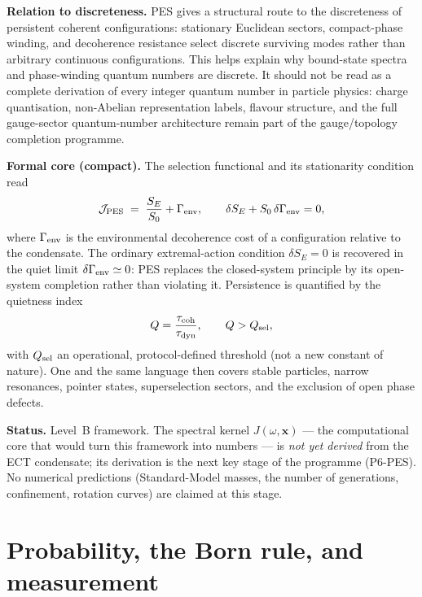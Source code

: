 \documentclass[11pt,a4paper]{article}
\begin{document}
\textbf{Relation to discreteness.} PES gives a structural route to the discreteness of persistent coherent configurations: stationary Euclidean sectors, compact-phase winding, and decoherence resistance select discrete surviving modes rather than arbitrary continuous configurations. This helps explain why bound-state spectra and phase-winding quantum numbers are discrete. It should not be read as a complete derivation of every integer quantum number in particle physics: charge quantisation, non-Abelian representation labels, flavour structure, and the full gauge-sector quantum-number architecture remain part of the gauge/topology completion programme.


\textbf{Formal core (compact).} The selection functional and its stationarity
condition read
\begin{equation}
  \mathcal{J}_{\rm PES}
  \;=\;
  \frac{S_E}{S_0}+\Gamma_{\rm env},
  \qquad
  \delta S_E+S_0\,\delta\Gamma_{\rm env}=0,
  \label{eq:comp_pes_functional}
\end{equation}
where $\Gamma_{\rm env}$ is the environmental decoherence cost of a
configuration relative to the condensate. The ordinary extremal-action
condition $\delta S_E=0$ is recovered in the quiet limit
$\delta\Gamma_{\rm env}\simeq 0$: PES replaces the closed-system principle by
its open-system completion rather than violating it. Persistence is
quantified by the quietness index
\begin{equation}
  Q=\frac{\tau_{\rm coh}}{\tau_{\rm dyn}},
  \qquad
  Q>Q_{\rm sel},
  \label{eq:comp_pes_quietness}
\end{equation}
with $Q_{\rm sel}$ an operational, protocol-defined threshold (not a new
constant of nature). One and the same language then covers stable particles,
narrow resonances, pointer states, superselection sectors, and the exclusion
of open phase defects.

\textbf{Status.} Level~B framework. The spectral kernel
$J(\omega,\mathbf{x})$ --- the computational core that would turn this
framework into numbers --- is \emph{not yet derived} from the ECT condensate;
its derivation is the next key stage of the programme (P6-PES). No numerical
predictions (Standard-Model masses, the number of generations, confinement,
rotation curves) are claimed at this stage.

\section{Probability, the Born rule, and measurement}
\end{document}
